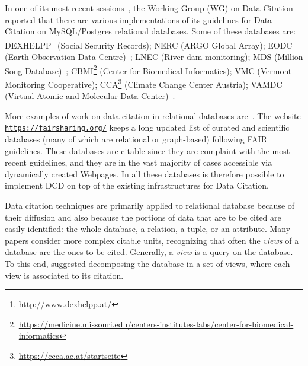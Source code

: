 In one of its most recent sessions~\citep{rauber2015data}, the Working Group (WG) on Data Citation reported that there are various implementations of its guidelines for Data Citation on MySQL/Postgres relational databases. 
Some of these databases are: DEXHELPP\footnote{\url{http://www.dexhelpp.at/}} (Social Security Records); NERC (ARGO Global Array); EODC (Earth Observation Data Centre)~\citep{gosswein2019data}; LNEC (River dam monitoring); MDS (Million Song Database)~\citep{bertin2011million}; CBMI\footnote{\url{https://medicine.missouri.edu/centers-institutes-labs/center-for-biomedical-informatics}} (Center for Biomedical Informatics); VMC (Vermont Monitoring Cooperative); CCA\footnote{\url{https://ccca.ac.at/startseite}} (Climate Change Center Austria); VAMDC (Virtual Atomic and Molecular Data Center)~\citep{Dubernet_2016, ZwolfEtAl2016}.

More examples of work on data citation in relational databases are~\citep{bunemann2016citation, WuSIGMOD18, AlawiniDHW17,davidson2017model, buneman2010rule}. 
The website \texttt{\url{https://fairsharing.org/}} keeps a long updated list of curated and scientific databases (many of which are relational or graph-based) following FAIR guidelines. These databases are citable since they are complaint with the most recent guidelines, and they are in the vast majority of cases accessible via dynamically created Webpages. 
In all these databases is therefore possible to implement DCD on top of the existing infrastructures for Data Citation.

Data citation techniques are primarily applied to relational database because of their diffusion and also because the portions of data that are to be cited are easily identified: the whole database, a relation, a tuple, or an attribute. 
Many papers \citep{buneman2006cite, bunemann2016citation, AlawiniDHW17} consider more complex citable units, recognizing that often the \emph{views} of a database are the ones to be cited. Generally, a \emph{view} is a query on the database.
To this end, \citep{WuSIGMOD18} suggested decomposing the database in a set of views, where each view is associated to its citation. 

